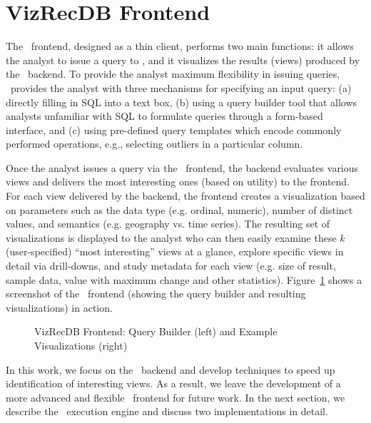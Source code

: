 

\section{VizRecDB Frontend}
\label{sec:VizRecDB_frontend}

The \VizRecDB\ frontend, designed as a thin client, performs two main functions: it
allows the analyst to issue a query to \VizRecDB, 
and it visualizes the results (views) produced by the \VizRecDB\
backend.
To provide the analyst maximum flexibility in issuing queries, \VizRecDB\
provides the analyst with three
mechanisms for specifying an input query: 
(a) directly filling in SQL into a text box, 
(b) using a query builder tool that allows analysts
unfamiliar with SQL to formulate queries through a form-based interface, and (c)
using pre-defined query templates which encode commonly performed operations,
e.g., selecting outliers in a particular column. 

Once the analyst issues a query via the \VizRecDB\ frontend, the backend
evaluates various views and delivers the most interesting ones (based on
utility) to the frontend.
For each view delivered by the backend, the frontend creates a visualization
based on parameters such as the data
type (e.g. ordinal, numeric), number of distinct values, and semantics (e.g.
geography vs. time series).
The resulting set of  visualizations is displayed to the analyst who can then
easily examine these $k$ (user-specified) ``most interesting'' views at a glance, 
explore specific views in detail via drill-downs, 
and study metadata for each view (e.g. size of result, sample data, value with
maximum change and other statistics). 
Figure~\ref{fig:frontend1} shows a screenshot of the \VizRecDB\ frontend (showing
the query builder and resulting visualizations) in action.
 
\begin{figure}[htb]
\vspace{-10pt}
\centerline{
\hbox{}
\hbox{}}
\vspace{-15pt}
\caption{VizRecDB Frontend: Query Builder (left) and Example Visualizations
(right)}
\label{fig:frontend1}
\vspace{-15pt}
\end{figure} 

In this work, we focus on the \VizRecDB\ backend and develop techniques to
speed up identification of interesting views. As a result, we leave the
development of a more advanced and flexible \VizRecDB\ frontend for future work. 
In the next section, we describe the \VizRecDB\ execution engine and discuss
two implementations in detail.
